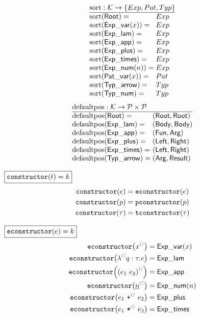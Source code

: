 \[
  \arraycolsep=0pt
  \begin{array}{ll}
    \multicolumn{2}{l}{\sortOp : \K \to \SetOf{Exp, Pat, Typ}} \\
    \hline
    \sort{\Root}={} & Exp \\
    \sort{\ExpVar(x)}={} & Exp \\
    \sort{\ExpLam}={} & Exp \\
    \sort{\ExpApp}={} & Exp \\
    \sort{\ExpPlus}={} & Exp \\
    \sort{\ExpTimes}={} & Exp \\
    \sort{\ExpNum(n)}={} & Exp \\
    \sort{\PatVar(x)}={} & Pat \\
    \sort{\TypArrow}={} & Typ \\
    \sort{\TypNum}={} & Typ \\
  \end{array}
\]
%
\figureArityContent
%
\[
  \arraycolsep=0pt
  \begin{array}{ll}
    \multicolumn{2}{l}{\defaultposOp : \K \to \P \times \P} \\
    \hline
    \defaultpos{\Root}={} & (\Root, \Root) \\
    \defaultpos{\ExpLam}={} & (\LamBody, \LamBody) \\
    \defaultpos{\ExpApp}={} & (\AppFun, \AppArg) \\
    \defaultpos{\ExpPlus}={} & (\PlusLeft, \PlusRight) \\
    \defaultpos{\ExpTimes}={} & (\TimesLeft, \TimesRight) \\
    \defaultpos{\TypArrow}={} & (\ArrowArg, \ArrowResult) \\
  \end{array}
\]
%

\noindent $\boxed{\operatorname{\texttt{constructor}}\mathopen{}\left(t\right)\mathclose{} = k}$
%
\begin{align*}
  \operatorname{\texttt{constructor}}\mathopen{}\left(e\right)\mathclose{} &= \operatorname{\texttt{econstructor}}\mathopen{}\left(e\right)\mathclose{} \\
  \operatorname{\texttt{constructor}}\mathopen{}\left(p\right)\mathclose{} &= \operatorname{\texttt{pconstructor}}\mathopen{}\left(p\right)\mathclose{} \\
  \operatorname{\texttt{constructor}}\mathopen{}\left(\tau\right)\mathclose{} &= \operatorname{\texttt{tconstructor}}\mathopen{}\left(\tau\right)\mathclose{}
\end{align*}

\noindent $\boxed{\operatorname{\texttt{econstructor}}\mathopen{}\left(e\right)\mathclose{} = k}$
%
\begin{align*}
  \econstructor{\eVar{G}{x}} &= \ExpVar(x) \\
  \econstructor{\eFun{G}{q}{\tau}{e}} &= \ExpLam \\
  \econstructor{\eApp{G}{e_1}{e_2}} &= \ExpApp \\
  \econstructor{\eNum{G}{n}} &= \ExpNum(n) \\
  \econstructor{\ePlus{G}{e_1}{e_2}} &= \ExpPlus \\
  \econstructor{\eTimes{G}{e_1}{e_2}} &= \ExpTimes
\end{align*}

